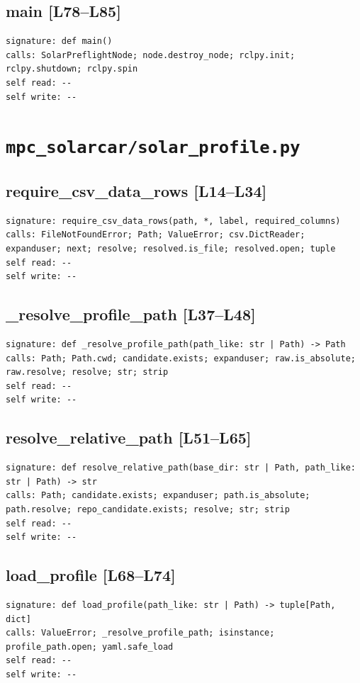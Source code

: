 \documentclass[a4paper,10pt,oneside]{book}
\begin{document}
\subsection*{main [L78--L85]}
\begin{lstlisting}[numbers=none]
signature: def main()
calls: SolarPreflightNode; node.destroy_node; rclpy.init; rclpy.shutdown; rclpy.spin
self read: --
self write: --
\end{lstlisting}
\section{\texttt{mpc\_solarcar/solar\_profile.py}}
\subsection*{require\_csv\_data\_rows [L14--L34]}
\begin{lstlisting}[numbers=none]
signature: require_csv_data_rows(path, *, label, required_columns)
calls: FileNotFoundError; Path; ValueError; csv.DictReader; expanduser; next; resolve; resolved.is_file; resolved.open; tuple
self read: --
self write: --
\end{lstlisting}
\subsection*{\_resolve\_profile\_path [L37--L48]}
\begin{lstlisting}[numbers=none]
signature: def _resolve_profile_path(path_like: str | Path) -> Path
calls: Path; Path.cwd; candidate.exists; expanduser; raw.is_absolute; raw.resolve; resolve; str; strip
self read: --
self write: --
\end{lstlisting}
\subsection*{resolve\_relative\_path [L51--L65]}
\begin{lstlisting}[numbers=none]
signature: def resolve_relative_path(base_dir: str | Path, path_like: str | Path) -> str
calls: Path; candidate.exists; expanduser; path.is_absolute; path.resolve; repo_candidate.exists; resolve; str; strip
self read: --
self write: --
\end{lstlisting}
\subsection*{load\_profile [L68--L74]}
\begin{lstlisting}[numbers=none]
signature: def load_profile(path_like: str | Path) -> tuple[Path, dict]
calls: ValueError; _resolve_profile_path; isinstance; profile_path.open; yaml.safe_load
self read: --
self write: --
\end{lstlisting}
\end{document}
